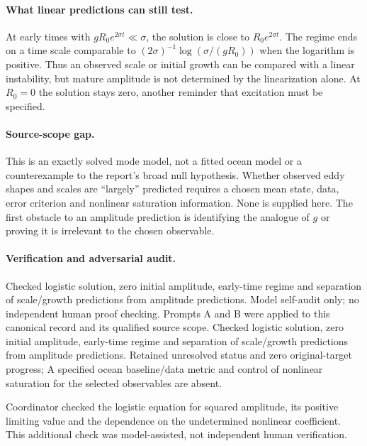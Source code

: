 \documentclass[11pt]{article}
\begin{document}
\paragraph{What linear predictions can still test.} At early times with $gR_0e^{2\sigma t}\ll\sigma$, the solution is close to $R_0e^{2\sigma t}$. The regime ends on a time scale comparable to $(2\sigma)^{-1}\log(\sigma/(gR_0))$ when the logarithm is positive. Thus an observed scale or initial growth can be compared with a linear instability, but mature amplitude is not determined by the linearization alone. At $R_0=0$ the solution stays zero, another reminder that excitation must be specified.

\paragraph{Source-scope gap.} This is an exactly solved mode model, not a fitted ocean model or a counterexample to the report's broad null hypothesis. Whether observed eddy shapes and scales are ``largely'' predicted requires a chosen mean state, data, error criterion and nonlinear saturation information. None is supplied here. The first obstacle to an amplitude prediction is identifying the analogue of $g$ or proving it is irrelevant to the chosen observable.

\paragraph{Verification and adversarial audit.}
Checked logistic solution, zero initial amplitude, early-time regime and separation of scale/growth predictions from amplitude predictions. Model self-audit only; no independent human proof checking. Prompts A and B were applied to this canonical record and its qualified source scope. Checked logistic solution, zero initial amplitude, early-time regime and separation of scale/growth predictions from amplitude predictions. Retained unresolved status and zero original-target progress; A specified ocean baseline/data metric and control of nonlinear saturation for the selected observables are absent.

Coordinator checked the logistic equation for squared amplitude, its positive limiting value and the dependence on the undetermined nonlinear coefficient. This additional check was model-assisted, not independent human verification.
\end{document}
